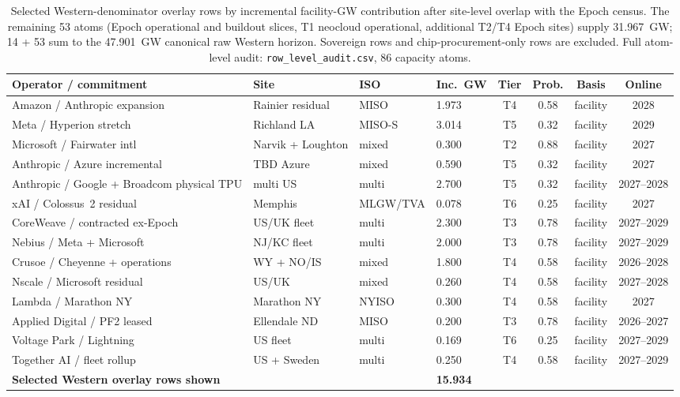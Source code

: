 \documentclass[11pt,a4paper]{article}
\begin{document}
\begin{table}[htbp]
\centering
\scriptsize
\renewcommand{\arraystretch}{1.08}
\setlength{\tabcolsep}{2.5pt}
\begin{tabular}{@{}L{3.1cm}L{2.05cm}L{1.25cm}R{0.9cm}cccc@{}}
\toprule
\textbf{Operator / commitment} & \textbf{Site} & \textbf{ISO} & \textbf{Inc.\ GW} & \textbf{Tier} & \textbf{Prob.} & \textbf{Basis} & \textbf{Online} \\
\midrule
Amazon / Anthropic expansion & Rainier residual & MISO & 1.973 & T4 & 0.58 & facility & 2028 \\
Meta / Hyperion stretch & Richland LA & MISO-S & 3.014 & T5 & 0.32 & facility & 2029 \\
Microsoft / Fairwater intl & Narvik + Loughton & mixed & 0.300 & T2 & 0.88 & facility & 2027 \\
Anthropic / Azure incremental & TBD Azure & mixed & 0.590 & T5 & 0.32 & facility & 2027 \\
Anthropic / Google + Broadcom physical TPU & multi US & multi & 2.700 & T5 & 0.32 & facility & 2027--2028 \\
xAI / Colossus~2 residual & Memphis & MLGW/\allowbreak TVA & 0.078 & T6 & 0.25 & facility & 2027 \\
CoreWeave / contracted ex-Epoch & US/UK fleet & multi & 2.300 & T3 & 0.78 & facility & 2027--2029 \\
Nebius / Meta + Microsoft & NJ/KC fleet & multi & 2.000 & T3 & 0.78 & facility & 2027--2029 \\
Crusoe / Cheyenne + operations & WY + NO/IS & mixed & 1.800 & T4 & 0.58 & facility & 2026--2028 \\
Nscale / Microsoft residual & US/UK & mixed & 0.260 & T4 & 0.58 & facility & 2027--2028 \\
Lambda / Marathon NY & Marathon NY & NYISO & 0.300 & T4 & 0.58 & facility & 2027 \\
Applied Digital / PF2 leased & Ellendale ND & MISO & 0.200 & T3 & 0.78 & facility & 2026--2027 \\
Voltage Park / Lightning & US fleet & multi & 0.169 & T6 & 0.25 & facility & 2027--2029 \\
Together AI / fleet rollup & US + Sweden & multi & 0.250 & T4 & 0.58 & facility & 2027--2029 \\
\midrule
\textbf{Selected Western overlay rows shown} & & & \textbf{15.934} & & & & \\
\bottomrule
\end{tabular}
\caption{Selected Western-denominator overlay rows by incremental facility-GW contribution after site-level overlap with the Epoch census. The remaining 53 atoms (Epoch operational and buildout slices, T1 neocloud operational, additional T2/T4 Epoch sites) supply 31.967~GW; 14 + 53 sum to the 47.901~GW canonical raw Western horizon. Sovereign rows and chip-procurement-only rows are excluded. Full atom-level audit: \texttt{row\_level\_audit.csv}, 86 capacity atoms.}
\end{table}
\end{document}
